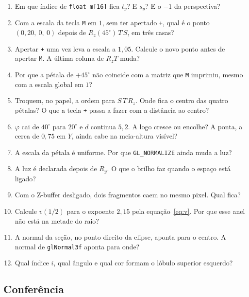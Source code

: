 \documentclass[11pt,a4paper]{article}
\newcommand{\fn}[1]{\texttt{\nobreak\hspace{0pt}#1}}
\begin{document}
\begin{enumerate}
\item Em que índice de \fn{float m[16]} fica \(t_y\)? E \(s_y\)? E o \(-1\) da perspectiva?
\item Com a escala da tecla \fn{M} em \(1\), sem ter apertado \fn{+}, qual é o ponto \((0{,}20,\ 0,\ 0)\) depois de \(R_z(45^\circ)\, T\, S\), em três casas?
\item Apertar \fn{+} uma vez leva a escala a \(1{,}05\). Calcule o novo ponto antes de apertar \fn{M}. A última coluna de \(R_z T\) muda?
\item Por que a pétala de \(+45^\circ\) não coincide com a matriz que \fn{M} imprimiu, mesmo com a escala global em \(1\)?
\item Troquem, no papel, a ordem para \(S\, T\, R_z\). Onde fica o centro das quatro pétalas? O que a tecla \fn{+} passa a fazer com a distância ao centro?
\item \(\varphi\) cai de \(40^\circ\) para \(20^\circ\) e \(d\) continua \(5{,}2\). A logo cresce ou encolhe? A ponta, a cerca de \(0{,}75\) em \(Y\), ainda cabe na meia-altura visível?
\item A escala da pétala é uniforme. Por que \fn{GL\_NORMALIZE} ainda muda a luz?
\item A luz é declarada depois de \(R_y\). O que o brilho faz quando o espaço está ligado?
\item Com o Z-buffer desligado, dois fragmentos caem no mesmo pixel. Qual fica?
\item Calcule \(v(1/2)\) para o expoente \(2{,}15\) pela equação~\eqref{eq:v}. Por que esse anel não está na metade do raio?
\item A normal da seção, no ponto direito da elipse, aponta para o centro. A normal de \fn{glNormal3f} aponta para onde?
\item Qual índice \(i\), qual ângulo e qual cor formam o lóbulo superior esquerdo?
\end{enumerate}

\newpage
\subsection*{Conferência}
\end{document}
